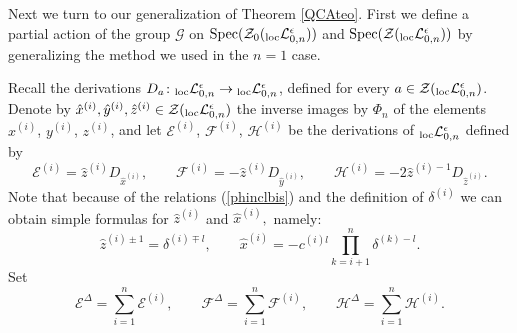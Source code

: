 \documentclass[pdftex]{sigma}%
\numberwithin{equation}{section}
\numberwithin{figure}{section}
\newcommand{\e}{\epsilon}
\newcommand{\Ll}{{\mathcal L}}
\newcommand{\ra}{\rightarrow}
\begin{document}
Next we turn to our generalization of Theorem \ref{QCAteo}. First we define a partial action of the group $\mathcal{G}$ on $\operatorname{Spec}({\mathcal{Z}}_0({}_{\rm loc}\Ll_{0,n}^\epsilon))$ and $\operatorname{Spec}({\mathcal{Z}}({}_{\rm loc}\Ll_{0,n}^\epsilon))$ by generalizing the method we used in the $n=1$ case.

Recall the derivations $D_a\colon {}_{\rm loc}\Ll_{0,n}^\epsilon \ra {}_{\rm loc}\Ll_{0,n}^\epsilon$, defined for every $a\in \mathcal{Z}({}_{\rm loc}\Ll_{0,n}^\e)$. Denote by $\hat{x}^{(i)}, \hat{y}^{(i)}, \hat{z}^{(i)}\in \mathcal{Z}({}_{\rm loc}\Ll_{0,n}^\e)$ the inverse images by $\Phi_n$ of the elements $x^{(i)}$, $y^{(i)}$, $z^{(i)}$, and let ${\mathcal E}^{(i)}$, ${\mathcal F}^{(i)}$, ${\mathcal H}^{(i)}$ be the derivations of ${}_{\rm loc}\Ll_{0,n}^\epsilon$ defined by
\begin{equation*}
{\mathcal E}^{(i)}= \hat{z}^{(i)} D_{\hat{x}^{(i)}},\qquad
{ \mathcal F}^{(i)}=-\hat{z}^{(i)} D_{\hat{y}^{(i)}},\qquad
{\mathcal H}^{(i)}=-2\hat{z}^{(i)-1} D_{\hat{z}^{(i)}}.
\end{equation*}
Note that because of the relations (\ref{phinclbis}) and the definition of $\delta^{(i)}$ we can obtain simple formulas for $\hat{z}^{(i)}$ and $\hat{x}^{(i)},$ namely:
\begin{equation*}
\hat{z}^{(i)\pm 1}=\delta^{(i)\mp l},\qquad
\hat{x}^{(i)}=-c^{(i)l}\prod_{k=i+1}^n \delta^{(k)-l}.
\end{equation*}
Set
\begin{equation*}
{\mathcal E}^{\Delta}= \sum_{i=1}^n{\mathcal E}^{(i)},\qquad
{\mathcal F}^{\Delta}= \sum_{i=1}^n{\mathcal F}^{(i)},\qquad
{\mathcal H}^{\Delta}= \sum_{i=1}^n{\mathcal H}^{(i)}.
\end{equation*}
\end{document}
